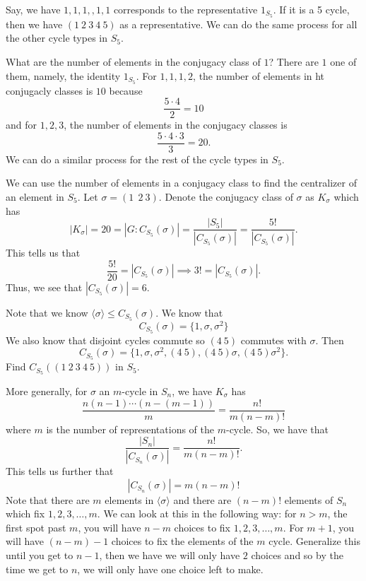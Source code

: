 Say, we have \( 1, 1, 1, ,1 ,1  \) corresponds to the representative \( {1}_{{S}_{5}} \). If it is a 5 cycle, then we have \( (1 \ 2 \ 3 \ 4 \ 5) \) as a representative. We can do the same process for all the other cycle types in \( {S}_{5} \).    

What are the number of elements in the conjugacy class of \( 1  \)? There are \( 1  \) one of them, namely, the identity \( {1}_{{S}_{5}} \). For \( 1 , 1 , 1, 2  \), the number of elements in ht conjugacly classes is \( 1 0 \) because   
\[  \frac{ 5 \cdot 4  }{ 2 }  = 10 \]
and for \( 1,2, 3 \), the number of elements in the conjugacy classes is  
\[  \frac{ 5 \cdot 4 \cdot 3  }{ 3 } = 2 0.   \]
We can do a similar process for the rest of the cycle types in \( {S}_{5} \). 

We can use the number of elements in a conjugacy class to find the centralizer of an element in \( {S}_{5} \). Let \( \sigma = (1 \ \ 2 \ 3) \). Denote the conjugacy class of \( \sigma \) as \( {K}_{\sigma} \) which has \[ | {K}_{\sigma} |  = 20 = | G : {C}_{{S}_{5}}(\sigma) | = \frac{ | {S}_{5} | }{ | {C}_{{S}_{5}}(\sigma) |  }  = \frac{ 5 !  }{ | {C}_{{S}_{5}} (\sigma)|  }.    \] 
This tells us that 
\[ \frac{ 5!  }{  20  }  = | {C}_{{S}_{5}}(\sigma) | \implies 3! = | {C}_{{S}_{5}} (\sigma) |.     \]
Thus, we see that \( | {C}_{{S}_{5}}(\sigma) |  = 6  \).

Note that we know \( \langle  \sigma \rangle \leq {C}_{{S}_{5}}(\sigma) \). We know that
\[  {C}_{{S}_{5}}(\sigma) = \{  1, \sigma , \sigma^{2} \}  \]
We also know that disjoint cycles commute so \( (4 \ 5) \) commutes with \( \sigma \). Then 
\[  {C}_{{S}_{5}}(\sigma) = \{  1 , \sigma, \sigma^{2} , (4 \ 5) , (4 \ 5) \sigma, (4 \ 5) \sigma^{2}  \}.  \]
Find \( {C}_{{S}_{5}}((1 \ 2 \ 3 \ 4 \ 5)) \) in \( {S}_{5} \).



More generally, for \( \sigma  \) an \( m  \)-cycle in \( {S}_{n} \), we have \( {K}_{\sigma}  \) has
\[  \frac{ n(n-1) \cdots (n - (m - 1))  }{ m  } = \frac{ n!  }{ m (n - m)! }   \]
where \( m  \) is the number of representations of the \( m  \)-cycle. So, we have that 
\[  \frac{ | {S}_{n} |   }{ | {C}_{{S}_{n}}(\sigma) |  }  = \frac{ n!  }{ m (n-m)! }. \]
This tells us further that 
\[  | {C}_{{S}_{n}}(\sigma) |  = m (n -m )! \]
Note that there are \( m \) elements in \( \langle  \sigma \rangle \) and there are \( (n-m)! \) elements of \( {S}_{n} \) which fix \( 1, 2, 3, \dots, m  \). We can look at this in the following way: for \( n > m  \), the first spot past \( m  \), you will have \(  n - m \) choices to fix \( 1, 2, 3, \dots, m  \). For \(  m + 1  \), you will have \(  (n -m ) -  1  \) choices to fix the elements of the \( m  \) cycle. Generalize this until you get to \( n - 1  \), then we have we will only have \( 2 \) choices and so by the time we get to \( n  \), we will only have one choice left to make.


